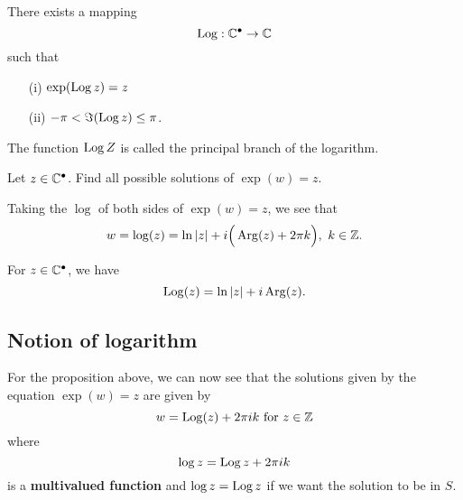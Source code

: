\documentclass[a4paper]{report}
\begin{document}
\begin{theorem}[ ]
    There exists a mapping 
    \[  \operatorname{Log}: \mathbb{C}^{\bullet} \to \mathbb{C}  \] such that 
    \begin{enumerate}
        \item[(i)] \( \exp(\operatorname{Log} z) = z  \)
        \item[(ii)] \( - \pi < \Im(\operatorname{Log} z) \leq \pi \).
    \end{enumerate}
\end{theorem}

\begin{definition}
    The function \( \operatorname{Log} Z  \) is called the principal branch of the logarithm. 
\end{definition}

\begin{problem}
    Let \( z \in \mathbb{C}^{\bullet} \). Find all possible solutions of \( \exp(w) = z  \).
\end{problem}

\begin{solution}
    Taking the \( \log \) of both sides of \( \exp(w) = z  \), we see that 
    \[  w  = \log(z) = \ln | z |  + i \Big(  \operatorname{Arg}(z) + 2 \pi k  \Big), \ k \in \mathbb{Z}.  \]
\end{solution}

\begin{lemma}
   For \( z \in \mathbb{C}^{\bullet} \), we have  
   \[  \operatorname{Log}(z) = \ln | z |  + i \operatorname{Arg}(z). \]
\end{lemma}

\subsection{Notion of logarithm}
For the proposition above, we can now see that the solutions given by the equation \( \exp(w) = z  \) are given by
\[  w = \Log(z) + 2 \pi i k  \ \text{for} \ z \in \Z   \]
where 
\[  \log z = \operatorname{Log} z + 2\pi i k  \]
is a \textbf{multivalued function} and \( \log z = \operatorname{Log} z  \) if we want the solution to be in \( S  \).
\end{document}
